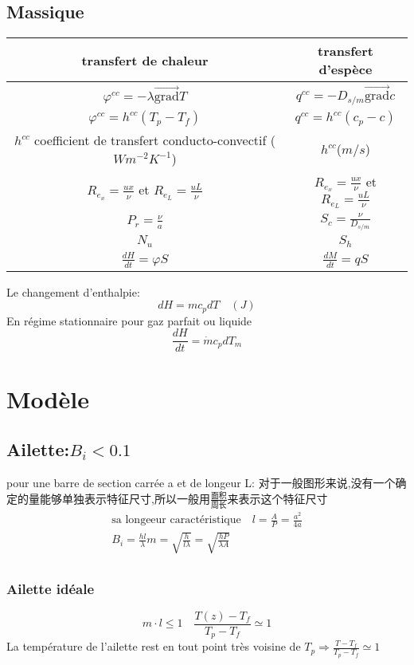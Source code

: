 \subsection{Massique}
\begin{tabular}{|c|c|}
\hline
transfert de chaleur & transfert d'esp\`ece \\
\hline
$\varphi^{cc}= - \lambda \vec{\mbox{grad}}T$ & $q^{cc}= - D_{s/m} \vec{\mbox{grad}}c $\\
\hline
$\varphi^{cc}=h^{cc}(T_p - T_f)$ & $q^{cc}=h^{cc}(c_p - c)$\\
\hline
$h^{cc}$ coefficient de transfert conducto-convectif ($Wm^{-2}K^{-1}$) & $h^{cc} $($m/s$) \\
\hline
$R_{e_x}=\frac{ux}{\nu}$ et $R_{e_L}=\frac{ uL}{\nu}$ & $R_{e_x}=\frac{ux}{\nu}$ et $R_{e_L}=\frac{ uL}{\nu}$ \\
\hline
$P_r=\frac{ \nu}{a} $& $S_c=\frac{\nu}{D_{s/m}} $\\
\hline
$N_u$ & $S_h $\\
\hline
$\frac{ dH}{dt}=\varphi S$ & $\frac{dM}{dt}=qS$\\
\hline
\end{tabular}

Le changement d'enthalpie: $$dH=m c_p dT \quad (J)$$
En r\'egime stationnaire pour gaz parfait ou liquide
$$\frac{ dH}{dt}=\dot{m}c_p dT_m$$


\section{Mod\`ele}
\subsection{Ailette:$B_i < 0.1$}
pour une barre de section carr\'ee a et de longeur L:
对于一般图形来说,没有一个确定的量能够单独表示特征尺寸,所以一般用$\frac{\text{面积}}{\text{周长}}$来表示这个特征尺寸
\begin{eqnarray}
\text{sa longeeur caract\'eristique}\quad l=\frac{A}{P}=\frac{a^2}{4a} \\
B_i = \frac{ hl}{\lambda }
m=\sqrt{\frac{ h}{l\lambda }}=\sqrt{\frac{ hP}{\lambda A}} \\
\end{eqnarray}
\subsubsection{Ailette id\'eale}
$$
m\cdot l \leq 1 \quad \frac{T(z)-T_f}{T_p - T_f} \simeq 1
$$
La temp\'erature de l'ailette rest en tout point tr\`es voisine de $T_p  \Rightarrow \frac{ T - T_f}{T_p - T_f}\simeq 1$
